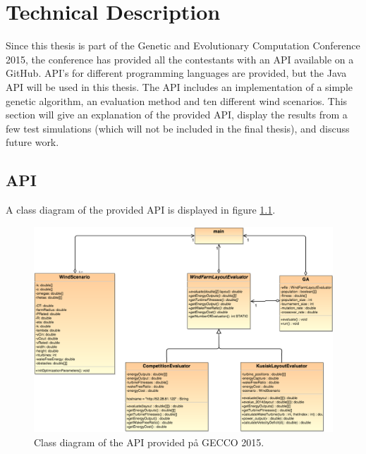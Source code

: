 \chapter{Technical Description}


Since this thesis is part of the Genetic and Evolutionary Computation Conference 2015, the conference has provided all the contestants with an API available on a GitHub. API's for different programming languages are provided, but the Java API will be used in this thesis. The API includes an implementation of a simple genetic algorithm, an evaluation method and ten different wind scenarios. This section will give an explanation of the provided API, display the results from a few test simulations (which will not be included in the final thesis), and discuss future work.


\section{API}


A class diagram of the provided API is displayed in figure \ref{Class Diagram}.


\begin{figure}
\begin{center}
\includegraphics[scale=0.5]{images/Class Diagram}
\caption{Class diagram of the API provided på GECCO 2015.}
\label{Class Diagram}
\end{center}
\end{figure}


